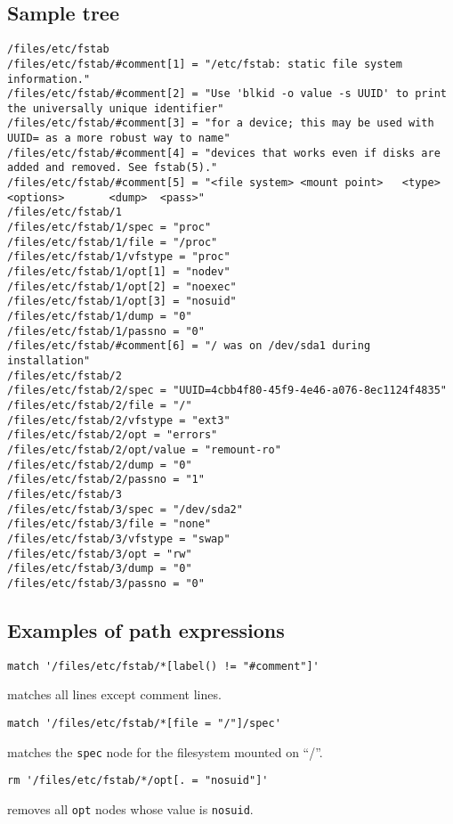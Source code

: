 \subsection{Sample tree}

\begin{verbatim}
/files/etc/fstab
/files/etc/fstab/#comment[1] = "/etc/fstab: static file system information."
/files/etc/fstab/#comment[2] = "Use 'blkid -o value -s UUID' to print the universally unique identifier"
/files/etc/fstab/#comment[3] = "for a device; this may be used with UUID= as a more robust way to name"
/files/etc/fstab/#comment[4] = "devices that works even if disks are added and removed. See fstab(5)."
/files/etc/fstab/#comment[5] = "<file system> <mount point>   <type>  <options>       <dump>  <pass>"
/files/etc/fstab/1
/files/etc/fstab/1/spec = "proc"
/files/etc/fstab/1/file = "/proc"
/files/etc/fstab/1/vfstype = "proc"
/files/etc/fstab/1/opt[1] = "nodev"
/files/etc/fstab/1/opt[2] = "noexec"
/files/etc/fstab/1/opt[3] = "nosuid"
/files/etc/fstab/1/dump = "0"
/files/etc/fstab/1/passno = "0"
/files/etc/fstab/#comment[6] = "/ was on /dev/sda1 during installation"
/files/etc/fstab/2
/files/etc/fstab/2/spec = "UUID=4cbb4f80-45f9-4e46-a076-8ec1124f4835"
/files/etc/fstab/2/file = "/"
/files/etc/fstab/2/vfstype = "ext3"
/files/etc/fstab/2/opt = "errors"
/files/etc/fstab/2/opt/value = "remount-ro"
/files/etc/fstab/2/dump = "0"
/files/etc/fstab/2/passno = "1"
/files/etc/fstab/3
/files/etc/fstab/3/spec = "/dev/sda2"
/files/etc/fstab/3/file = "none"
/files/etc/fstab/3/vfstype = "swap"
/files/etc/fstab/3/opt = "rw"
/files/etc/fstab/3/dump = "0"
/files/etc/fstab/3/passno = "0"
\end{verbatim}
\subsection{Examples of path expressions}

\begin{verbatim}
match '/files/etc/fstab/*[label() != "#comment"]'
\end{verbatim}
matches all lines except comment lines.

\begin{verbatim}
match '/files/etc/fstab/*[file = "/"]/spec'
\end{verbatim}
matches the \verb!spec! node for the filesystem mounted on ``/''.

\begin{verbatim}
rm '/files/etc/fstab/*/opt[. = "nosuid"]'
\end{verbatim}
removes all \verb!opt! nodes whose value is \verb!nosuid!.

